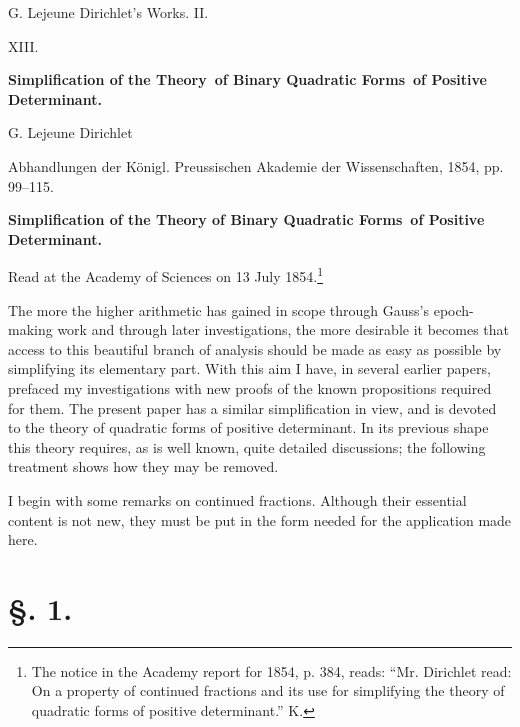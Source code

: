 \documentclass[11pt]{article}
\begin{document}
\begin{center}
{\Large G. Lejeune Dirichlet's Works. II.}\par\vspace{1.2em}
{\Large XIII.}\par\vspace{0.5em}
{\LARGE \textbf{Simplification of the Theory\ of Binary Quadratic Forms\ of Positive Determinant.}}\par\vspace{1em}
{\large G. Lejeune Dirichlet}\par\vspace{0.5em}
{\small Abhandlungen der Königl. Preussischen Akademie der Wissenschaften, 1854, pp. 99--115.}
\end{center}

\begin{center}
{\large \textbf{Simplification of the Theory of Binary Quadratic Forms\ of Positive Determinant.}}\par
{\small Read at the Academy of Sciences on 13 July 1854.\footnote{The notice in the Academy report for 1854, p. 384, reads: ``Mr. Dirichlet read: On a property of continued fractions and its use for simplifying the theory of quadratic forms of positive determinant.'' K.}}
\end{center}

The more the higher arithmetic has gained in scope through Gauss's epoch-making work and through later investigations, the more desirable it becomes that access to this beautiful branch of analysis should be made as easy as possible by simplifying its elementary part. With this aim I have, in several earlier papers, prefaced my investigations with new proofs of the known propositions required for them. The present paper has a similar simplification in view, and is devoted to the theory of quadratic forms of positive determinant. In its previous shape this theory requires, as is well known, quite detailed discussions; the following treatment shows how they may be removed.

I begin with some remarks on continued fractions. Although their essential content is not new, they must be put in the form needed for the application made here.

\section*{\S. 1.}
\end{document}
